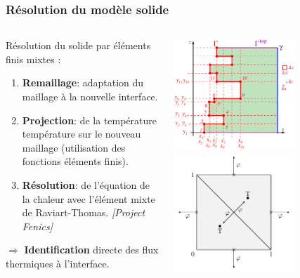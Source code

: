 \documentclass{beamer}
\newcommand{\bib}[1]{{\color{cea_texte!80}\tiny\textit{[#1]}}}
\begin{document}
\begin{frame}
    \frametitle{Résolution du modèle solide}
    \footnotesize


\begin{columns}[c]
	\begin{column}{0.6\textwidth}
	\begin{ceablock}{Résolution du solide par éléments finis mixtes :}
\begin{enumerate}
			\item \textbf{Remaillage}: adaptation du maillage à la nouvelle interface.
			\item \textbf{Projection}: de la température température sur le nouveau maillage (utilisation des fonctions éléments finis).
			\item \textbf{Résolution}: de l'équation de la chaleur avec l'élément mixte de Raviart-Thomas. \bib{Project Fenics}
		\end{enumerate}
\center $\Rightarrow$ \textbf{Identification} directe des flux thermiques à l'interface.
		\end{ceablock}
	\end{column}
	\begin{column}{0.5\textwidth}
	\center
		\includegraphics[width=0.65\textwidth]{Figures/crust_mesh.pdf}\\
		\includegraphics[width=0.65\textwidth]{Figures/elementFiniMixte2.pdf}

		
			\end{column}

	\end{columns}

\end{frame}
\end{document}
